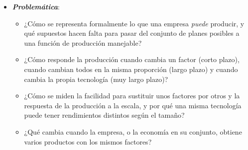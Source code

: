 \documentclass[11pt]{article}
\begin{document}
\begin{itemize}
\item \textbf{\emph{Problemática}}:
  \begin{itemize}
  \item ¿Cómo se representa formalmente lo que una empresa \emph{puede} producir, y qué supuestos hacen falta para pasar del conjunto de planes posibles a una función de producción manejable?
  \item ¿Cómo responde la producción cuando cambia un factor (corto plazo), cuando cambian todos en la misma proporción (largo plazo) y cuando cambia la propia tecnología (muy largo plazo)?
  \item ¿Cómo se miden la facilidad para sustituir unos factores por otros y la respuesta de la producción a la escala, y por qué una misma tecnología puede tener rendimientos distintos según el tamaño?
  \item ¿Qué cambia cuando la empresa, o la economía en su conjunto, obtiene varios productos con los mismos factores?
  \end{itemize}


\end{itemize}
\end{document}
